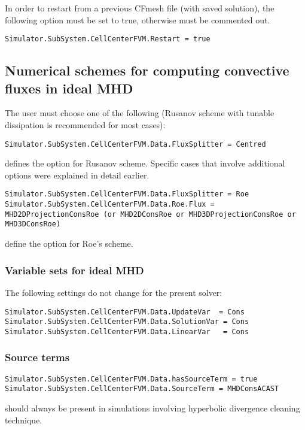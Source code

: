 \documentclass[11pt]{article}
\begin{document}
In order to restart from a previous CFmesh file (with saved solution), the following option must be set to true, 
otherwise must be commented out.
\begin{lstlisting}[breaklines]
Simulator.SubSystem.CellCenterFVM.Restart = true
\end{lstlisting}

\subsection{Numerical schemes for computing convective fluxes in ideal MHD}

The user must choose one of the following (Rusanov scheme with tunable dissipation is recommended for most cases):

\begin{lstlisting}[breaklines]
Simulator.SubSystem.CellCenterFVM.Data.FluxSplitter = Centred
\end{lstlisting}
defines the option for Rusanov scheme. Specific cases that involve additional options were explained in detail earlier.

\begin{lstlisting}[breaklines]
Simulator.SubSystem.CellCenterFVM.Data.FluxSplitter = Roe
Simulator.SubSystem.CellCenterFVM.Data.Roe.Flux = MHD2DProjectionConsRoe (or MHD2DConsRoe or MHD3DProjectionConsRoe or MHD3DConsRoe)
\end{lstlisting}
define the option for Roe's scheme.

\subsubsection{Variable sets for ideal MHD}

The following settings do not change for the present solver:

\begin{lstlisting}[breaklines]
Simulator.SubSystem.CellCenterFVM.Data.UpdateVar  = Cons
Simulator.SubSystem.CellCenterFVM.Data.SolutionVar = Cons
Simulator.SubSystem.CellCenterFVM.Data.LinearVar   = Cons
\end{lstlisting}

\subsubsection{Source terms}

\begin{lstlisting}[breaklines]
Simulator.SubSystem.CellCenterFVM.Data.hasSourceTerm = true
Simulator.SubSystem.CellCenterFVM.Data.SourceTerm = MHDConsACAST
\end{lstlisting}
should always be present in simulations involving hyperbolic divergence cleaning technique. 
\end{document}

